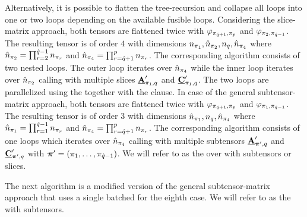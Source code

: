 Alternatively, it is possible to flatten the tree-recursion and collapse all loops into one or two loops depending on the available fusible loops.
Considering the slice-matrix approach, both tensors are flattened twice with $\varphi_{\pi_{\hat{q}+1},\pi_p}$ and $\varphi_{\pi_{2},\pi_{\hat{q}-1}}$. 
The resulting tensor is of order $4$ with dimensions $n_{\pi_1}, \hat{n}_{\pi_2}, n_{q}, \hat{n}_{\pi_4}$ where $\hat{n}_{\pi_2} = \prod_{r=2}^{\hat{q}-1} n_{\pi_r}$ and $\hat{n}_{\pi_4} = \prod_{r=\hat{q}+1}^{p} n_{\pi_r}$.
The corresponding algorithm consists of two nested loops.
The outer loop iterates over $\hat{n}_{\pi_4}$ while the inner loop iterates over $\hat{n}_{\pi_2}$ calling  with multiple slices $\underline{\mathbf{A}}_{\pi_1,q}'$ and $\underline{\mathbf{C}}_{\pi_1,q}'$.
The two loops are parallelized using the  together with the  clause.
In case of the general subtensor-matrix approach, both tensors are flattened twice with $\varphi_{\pi_{\hat{q}+1},\pi_p}$ and $\varphi_{\pi_{1},\pi_{\hat{q}-1}}$. 
The resulting tensor is of order $3$ with dimensions $\hat{n}_{\pi_1}, n_{q}, \hat{n}_{\pi_4}$ where $\hat{n}_{\pi_1} = \prod_{r=1}^{\hat{q}-1} n_{\pi_r}$ and $\hat{n}_{\pi_4} = \prod_{r=\hat{q}+1}^{p} n_{\pi_r}$.
The corresponding algorithm consists of one loops which iterates over $\hat{n}_{\pi_4}$ calling  with multiple subtensors $\underline{\mathbf{A}}_{\boldsymbol{\pi}',q}'$ and $\underline{\mathbf{C}}_{\boldsymbol{\pi}',q}'$ with $\boldsymbol{\pi}' = (\pi_1,\dots,\pi_{\hat{q}-1})$.
We will refer to as the   over   with subtensors or slices.

The next algorithm is a modified version of the general subtensor-matrix approach that uses a single batched  for the eighth case.
We will refer to as the   with subtensors.
